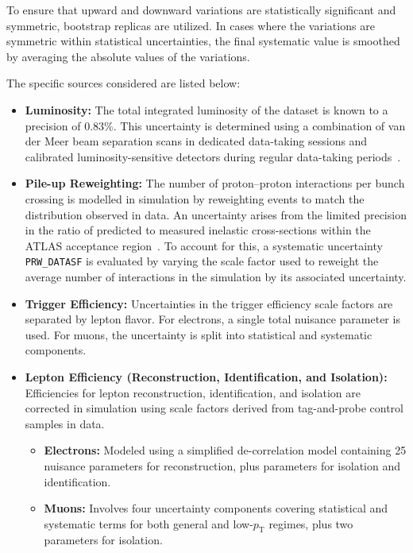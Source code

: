 To ensure that upward and downward variations are statistically significant and symmetric, bootstrap replicas are utilized. In cases where the variations are symmetric within statistical uncertainties, the final systematic value is smoothed by averaging the absolute values of the variations.

The specific sources considered are listed below:

\begin{itemize}
    \item \textbf{Luminosity:} 
    The total integrated luminosity of the dataset is known to a precision of $0.83\%$. This uncertainty is determined using a combination of van der Meer beam separation scans in dedicated data-taking sessions and calibrated luminosity-sensitive detectors during regular data-taking periods~\cite{DAPR-2021-01}.
    
    \item \textbf{Pile-up Reweighting:} 
    The number of proton--proton interactions per bunch crossing is modelled in simulation by reweighting events to match the distribution observed in data. An uncertainty arises from the limited precision in the ratio of predicted to measured inelastic cross-sections within the ATLAS acceptance region~\cite{STDM-2015-05}. To account for this, a systematic uncertainty \texttt{PRW\_DATASF} is evaluated by varying the scale factor used to reweight the average number of interactions in the simulation by its associated uncertainty.

    \item \textbf{Trigger Efficiency:} 
    Uncertainties in the trigger efficiency scale factors are separated by lepton flavor. For electrons, a single total nuisance parameter is used. For muons, the uncertainty is split into statistical and systematic components.

    \item \textbf{Lepton Efficiency (Reconstruction, Identification, and Isolation):} 
    Efficiencies for lepton reconstruction, identification, and isolation are corrected in simulation using scale factors derived from tag-and-probe control samples in data.
    \begin{itemize}
        \item \textbf{Electrons:} Modeled using a simplified de-correlation model containing 25 nuisance parameters for reconstruction, plus parameters for isolation and identification.
        \item \textbf{Muons:} Involves four uncertainty components covering statistical and systematic terms for both general and low-$p_{\text{T}}$ regimes, plus two parameters for isolation.
    \end{itemize}


\end{itemize}
